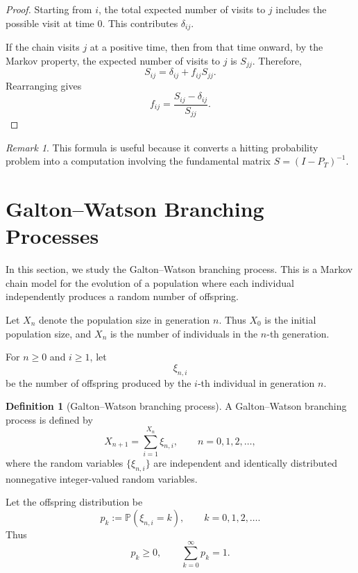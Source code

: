 \documentclass[11pt]{article}
\theoremstyle{plain}
\theoremstyle{definition}
\newtheorem{definition}[theorem]{Definition}
\theoremstyle{remark}
\newtheorem{remark}[theorem]{Remark}
\begin{document}
	\begin{proof}
		Starting from \(i\), the total expected number of visits to \(j\) includes the possible visit at time \(0\). This contributes \(\delta_{ij}\).
		
		If the chain visits \(j\) at a positive time, then from that time onward, by the Markov property, the expected number of visits to \(j\) is \(S_{jj}\). Therefore,
		\[
		S_{ij}
		=
		\delta_{ij}
		+
		f_{ij}S_{jj}.
		\]
		Rearranging gives
		\[
		f_{ij}
		=
		\frac{S_{ij}-\delta_{ij}}{S_{jj}}.
		\]
	\end{proof}
	
	\begin{remark}
		This formula is useful because it converts a hitting probability problem into a computation involving the fundamental matrix \(S=(I-P_T)^{-1}\).
	\end{remark}
	
	
	
	\section{Galton--Watson Branching Processes}
	
	In this section, we study the Galton--Watson branching process. This is a Markov chain model for the evolution of a population where each individual independently produces a random number of offspring.
	
	Let \(X_n\) denote the population size in generation \(n\). Thus \(X_0\) is the initial population size, and \(X_n\) is the number of individuals in the \(n\)-th generation.
	
	For \(n\ge 0\) and \(i\ge 1\), let
	\[
	\xi_{n,i}
	\]
	be the number of offspring produced by the \(i\)-th individual in generation \(n\).
	
	\begin{definition}[Galton--Watson branching process]
		A Galton--Watson branching process is defined by
		\[
		X_{n+1}
		=
		\sum_{i=1}^{X_n}\xi_{n,i},
		\qquad n=0,1,2,\dots,
		\]
		where the random variables \(\{\xi_{n,i}\}\) are independent and identically distributed nonnegative integer-valued random variables.
	\end{definition}
	
	Let the offspring distribution be
	\[
	p_k:=\mathbb{P}(\xi_{n,i}=k),
	\qquad k=0,1,2,\dots.
	\]
	Thus
	\[
	p_k\ge 0,
	\qquad
	\sum_{k=0}^{\infty}p_k=1.
	\]
	
\end{document}
